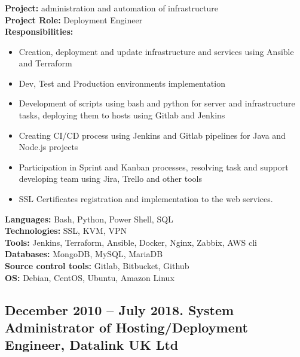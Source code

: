 \documentclass[letterpaper]{article}
\begin{document}
\subsubsection{}
\label{sec-2-1-1}
\textbf{Project:} administration and automation of infrastructure\\
\textbf{Project Role:}  Deployment Engineer\\
\textbf{Responsibilities:}\\
\begin{itemize}
\item Creation, deployment and update infrastructure and services using Ansible and Terraform
\item Dev, Test and Production environments implementation
\item Development of scripts using bash and python for server and infrastructure tasks, deploying them to hosts using Gitlab and Jenkins
\item Creating CI/CD process using Jenkins and Gitlab pipelines for Java and Node.js projects
\item Participation in Sprint and Kanban processes, resolving task and support developing team using Jira, Trello and other tools
\item SSL Certificates registration and implementation to the web services.
\end{itemize}
\textbf{Languages:} Bash, Python, Power Shell, SQL\\
\textbf{Technologies:} SSL, KVM, VPN\\
\textbf{Tools:} Jenkins, Terraform, Ansible, Docker, Nginx, Zabbix, AWS cli\\ 
\textbf{Databases:} MongoDB, MySQL, MariaDB\\
\textbf{Source control tools:} Gitlab, Bitbucket, Github\\
\textbf{OS:} Debian, CentOS, Ubuntu, Amazon Linux \\
\subsection{{December 2010 – July 2018}. System Administrator of Hosting/Deployment Engineer, Datalink UK Ltd}
\label{sec-2-1}
\end{document}
